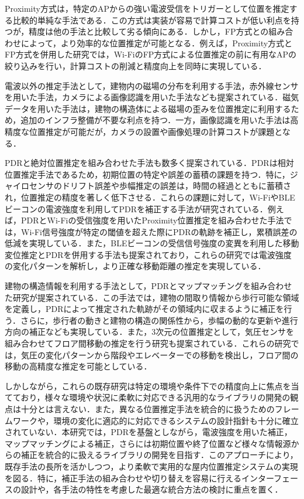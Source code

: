 Proximity方式は，特定のAPからの強い電波受信をトリガーとして位置を推定する比較的単純な手法である．この方式は実装が容易で計算コストが低い利点を持つが，精度は他の手法と比較して劣る傾向にある．しかし，FP方式との組み合わせによって，より効率的な位置推定が可能となる．例えば，Proximity方式とFP方式を併用した研究\cite{proximity-fingerprint}では，Wi-FiのFP方式による位置推定の前に有用なAPの絞り込みを行い，計算コストの削減と精度向上を同時に実現している．

電波以外の推定手法として，建物内の磁場の分布を利用する手法\cite{pdr-mag}，赤外線センサを用いた手法\cite{infrared}，カメラによる画像認識を用いた手法\cite{camera}なども提案されている．磁気データを用いた手法は，建物の構造体による磁場の歪みを位置推定に利用するため，追加のインフラ整備が不要な利点を持つ．一方，画像認識を用いた手法は高精度な位置推定が可能だが，カメラの設置や画像処理の計算コストが課題となる．

PDRと絶対位置推定を組み合わせた手法も数多く提案されている．PDRは相対位置推定手法であるため，初期位置の特定や誤差の蓄積の課題を持つ．特に，ジャイロセンサのドリフト誤差や歩幅推定の誤差は，時間の経過とともに蓄積され，位置推定の精度を著しく低下させる．これらの課題に対して，Wi-FiやBLEビーコンの電波強度を利用してPDRを補正する手法が研究されている．例えば，PDRとWi-Fiの受信強度を用いたProximity位置推定を組み合わせた手法\cite{pdr-wifi}では，Wi-Fi信号強度が特定の閾値を超えた際にPDRの軌跡を補正し，累積誤差の低減を実現している．また，BLEビーコンの受信信号強度の変異を利用した移動変位推定とPDRを併用する手法\cite{pdr-ble}も提案されており，これらの研究では電波強度の変化パターンを解析し，より正確な移動距離の推定を実現している．

建物の構造情報を利用する手法として，PDRとマップマッチングを組み合わせた研究\cite{pdr-map}が提案されている．この手法では，建物の間取り情報から歩行可能な領域を定義し，PDRによって推定された軌跡がその領域内に収まるように補正を行う．さらに，歩行者の動きと建物の構造の関係性から，歩幅の動的な更新や進行方向の補正なども実現している．また，3次元の位置推定として，気圧センサを組み合わせてフロア間移動の推定を行う研究\cite{pdr-wifi}\cite{pdr-stable}も提案されている．これらの研究では，気圧の変化パターンから階段やエレベーターでの移動を検出し，フロア間の移動の高精度な推定を可能としている．

しかしながら，これらの既存研究は特定の環境や条件下での精度向上に焦点を当てており，様々な環境や状況に柔軟に対応できる汎用的なライブラリの開発の観点は十分とは言えない．また，異なる位置推定手法を統合的に扱うためのフレームワークや，環境の変化に適応的に対応できるシステムの設計指針も十分に確立されていない．本研究では，PDRを基盤としながら，電波強度を用いた補正，マップマッチングによる補正，さらには初期位置や終了位置など様々な情報源からの補正を統合的に扱えるライブラリの開発を目指す．このアプローチにより，既存手法の長所を活かしつつ，より柔軟で実用的な屋内位置推定システムの実現を図る．特に，補正手法の組み合わせや切り替えを容易に行えるインターフェースの設計や，各手法の特性を考慮した最適な統合方法の検討に重点を置く．


